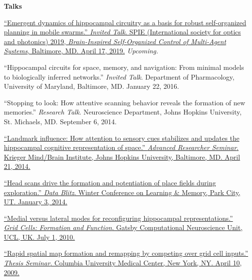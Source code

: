 \documentclass[10pt]{article}
\begin{document}
\begin{description}
\item \textbf{Talks}
\item[\quad] \href{https://spie.org/SI/conferencedetails/micro-nanotechnology-sensors-systems-applications?SSO=1#session-15}{``Emergent dynamics of hippocampal circuitry as a basis for robust self-organized planning in mobile swarms.'' \emph{Invited Talk}. SPIE (International society for optics and photonics) 2019, \emph{Brain-Inspired Self-Organized Control of Multi-Agent Systems}, Baltimore, MD. April 17, 2019.} \emph{Upcoming.}
\item[\quad] ``Hippocampal circuits for space, memory, and navigation: From minimal models to biologically inferred networks.'' \emph{Invited Talk}. Department of Pharmacology, University of Maryland, Baltimore, MD. January 22, 2016.
\item[\quad] ``Stopping to look: How attentive scanning behavior reveals the formation of new memories.'' \emph{Research Talk}. Neuroscience Department, Johns Hopkins University, St. Michaels, MD. September 6, 2014.
\item[\quad] \href{http://jdmonaco.com/files/mbi-seminar-abstract.pdf}{``Landmark influence: How attention to sensory cues stabilizes and updates the hippocampal cognitive representation of space.'' \emph{Advanced Researcher Seminar}. Krieger Mind/Brain Institute, Johns Hopkins University, Baltimore, MD. April 21, 2014.}
\item[\quad] \href{http://jdmonaco.com/files/ScanningSlide.pdf}{``Head scans drive the formation and potentiation of place fields during exploration.'' \emph{Data Blitz}. Winter Conference on Learning \& Memory, Park City, UT. January 3, 2014.}
\item[\quad] \href{http://www.gatsby.ucl.ac.uk/workshopjune2010/abstractmonaco.htm}{``Medial versus lateral modes for reconfiguring hippocampal representations.'' \emph{Grid Cells: Formation and Function}. Gatsby Computational Neuroscience Unit, UCL, UK. July 1, 2010.}
\item[\quad] \href{http://dx.doi.org/10.6084/m9.figshare.693750}{``Rapid spatial map formation and remapping by competing over grid cell inputs.'' \emph{Thesis Seminar}. Columbia University Medical Center, New York, NY. April 10, 2009.}
\end{description}
\end{document}
